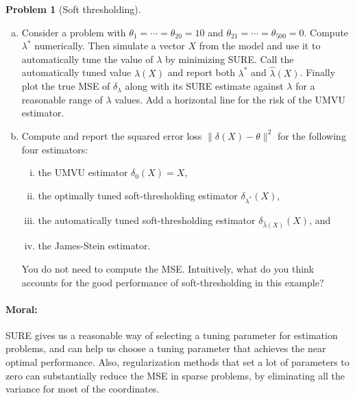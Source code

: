 \documentclass{article}
\theoremstyle{definition}
\newtheorem{problem}{Problem}
\begin{document}
\begin{problem}[Soft thresholding]
\begin{enumerate}[(a)]
\item Consider a problem with $\theta_1 = \cdots = \theta_{20} = 10$ and $\theta_{21} = \cdots = \theta_{500} = 0$. Compute $\lambda^*$ numerically. Then simulate a vector $X$ from the model and use it to automatically tune the value of $\lambda$ by minimizing SURE. Call the automatically tuned value $\hat\lambda(X)$ and report both $\lambda^*$ and $\hat\lambda(X)$. Finally plot the true MSE of $\delta_\lambda$ along with its SURE estimate against $\lambda$ for a reasonable range of $\lambda$ values. Add a horizontal line for the risk of the UMVU estimator.

  

\item Compute and report the squared error loss $\|\delta(X) - \theta\|^2$ for the following four estimators:
\begin{enumerate}[(i)]
\item the UMVU estimator $\delta_0(X) = X$,
\item the optimally tuned soft-thresholding estimator $\delta_{\lambda^*}(X)$,
\item the automatically tuned soft-thresholding estimator $\delta_{\hat{\lambda}(X)}(X)$, and
\item the James-Stein estimator.
\end{enumerate}

You do not need to compute the MSE. Intuitively, what do you think accounts for the good performance of soft-thresholding in this example?



\end{enumerate}

\paragraph{Moral:} SURE gives us a reasonable way of selecting a tuning parameter for estimation problems, and can help us choose a tuning parameter that achieves the near optimal performance. Also, regularization methods that set a lot of parameters to zero can substantially reduce the MSE in sparse problems, by eliminating all the variance for most of the coordinates.
\end{problem}
\end{document}
